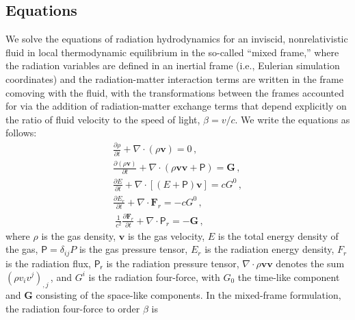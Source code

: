 \documentclass[fleqn,usenatbib]{mnras}
\newcommand{\vc}[1]{{\mathbf{#1}}}
\begin{document}
\subsection{Equations}
We solve the equations of radiation hydrodynamics \citep{Pomraning_1973,Mihalas_1984,Castor_2004} for an inviscid, nonrelativistic fluid
in local thermodynamic equilibrium in the so-called ``mixed frame,'' where the radiation variables are defined in an inertial frame (i.e., Eulerian simulation coordinates) and the radiation-matter interaction terms are written 
in the frame comoving with the fluid, with the transformations between the frames accounted for via the addition of radiation-matter exchange terms that depend explicitly on the ratio of fluid velocity to the speed of light, $\beta=v/c$.
We write the equations as follows:
\begin{align}
    \frac{\partial \rho}{\partial t} + \nabla \cdot (\rho \vc{v}) = 0 \, , \\
    \frac{\partial (\rho \vc{v})}{\partial t} + \nabla \cdot (\rho \vc{v} \vc{v} + \mathsf{P}) = \vc{G} \, , \\
    \frac{\partial E}{\partial t} + \nabla \cdot \left[(E + \mathsf{P})\vc{v}\right] = c G^0 \, , \\
    \frac{\partial E_r}{\partial t} + \nabla \cdot {\vc{F}_r} = -c G^0 \, , \\\
    \frac{1}{c^2}\frac{\partial \vc{F}_r}{\partial t} + \nabla \cdot \mathsf{P}_r = -\vc{G} \, ,
\end{align}
where $\rho$ is the gas density, $\vc{v}$ is the gas velocity, $E$ is the total energy density of the gas, $\mathsf{P} = \delta_{ij} P$ is the gas pressure tensor, $E_r$ is the radiation energy density, $F_r$ is the radiation flux, $\mathsf{P_r}$ is the radiation pressure tensor, $\nabla \cdot \rho \vc{v} \vc{v}$ denotes the sum $(\rho v_i v^j)_{,j}\,$, and $G^i$ is the radiation four-force, with $G_0$ the time-like component and $\vc{G}$ consisting of the space-like components. 
In the mixed-frame formulation, the radiation four-force to order $\beta$ is
\end{document}

